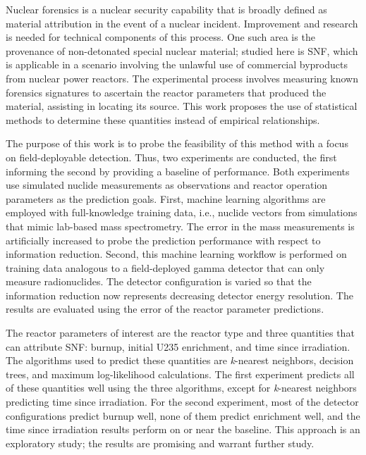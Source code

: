 Nuclear forensics is a nuclear security capability that is broadly defined as
material attribution in the event of a nuclear incident.  Improvement and
research is needed for technical components of this process.  One such area is
the provenance of non-detonated special nuclear material; studied here is
\gls{SNF}, which is applicable in a scenario involving the unlawful use of
commercial byproducts from nuclear power reactors.  The experimental process
involves measuring known forensics signatures to ascertain the reactor
parameters that produced the material, assisting in locating its source.  This
work proposes the use of statistical methods to determine these quantities
instead of empirical relationships. 

The purpose of this work is to probe the feasibility of this method with a
focus on field-deployable detection.  Thus, two experiments are conducted, the
first informing the second by providing a baseline of performance.  Both
experiments use simulated nuclide measurements as observations and reactor
operation parameters as the prediction goals.  First, machine learning
algorithms are employed with full-knowledge training data, i.e., nuclide
vectors from simulations that mimic lab-based mass spectrometry. The error in
the mass measurements is artificially increased to probe the prediction
performance with respect to information reduction. Second, this machine
learning workflow is performed on training data analogous to a field-deployed
gamma detector that can only measure radionuclides. The detector configuration
is varied so that the information reduction now represents decreasing detector
energy resolution.  The results are evaluated using the error of the reactor
parameter predictions.

The reactor parameters of interest are the reactor type and three quantities
that can attribute \gls{SNF}: burnup, initial \acrshort{U235} enrichment, and
time since irradiation. The algorithms used to predict these quantities are
\textit{k}-nearest neighbors, decision trees, and maximum log-likelihood
calculations. The first experiment predicts all of these quantities well using
the three algorithms, except for \textit{k}-nearest neighbors predicting time
since irradiation. For the second experiment, most of the detector
configurations predict burnup well, none of them predict enrichment well, and
the time since irradiation results perform on or near the baseline.  This
approach is an exploratory study; the results are promising and warrant further
study.

